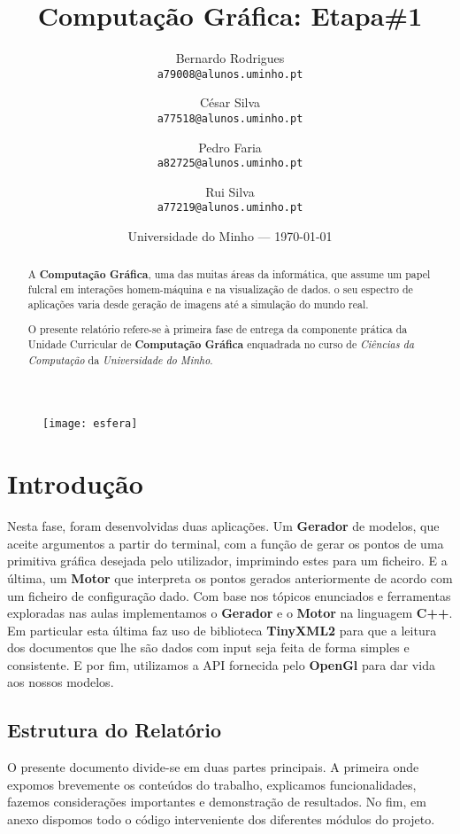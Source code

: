 \documentclass{article}
\title{Computação Gráfica: Etapa\#1} %
\author{Bernardo Rodrigues\\ \texttt{a79008@alunos.uminho.pt}\\ \and César Silva\\ \texttt{a77518@alunos.uminho.pt}\\ \and Pedro Faria\\ \texttt{a82725@alunos.uminho.pt} \and Rui Silva\\ \texttt{a77219@alunos.uminho.pt}\\} %
\date{Universidade do Minho --- \today} %
\begin{document}
\maketitle 
\begin{figure}[H]
	\centering
	\texttt{[image: esfera]}
\end{figure}
\newpage

\begin{abstract}
A \textbf{Computação Gráfica}, uma das muitas áreas da informática, que assume um papel fulcral em interações homem-máquina e na visualização de dados. o seu espectro de aplicações varia desde geração de imagens até a simulação do mundo real. \par
	O presente relatório refere-se à primeira fase de entrega da componente prática da Unidade Curricular de \textbf{Computação Gráfica} enquadrada no curso de \textit{Ciências da Computação} da \textit{Universidade do Minho}. 
\end{abstract}
\newpage


\tableofcontents{}
\newpage


\section{Introdução}

Nesta fase, foram desenvolvidas duas aplicações. Um \textbf{Gerador} de modelos, que aceite argumentos a partir do terminal, com a função de gerar os pontos de uma primitiva gráfica desejada pelo utilizador, imprimindo estes para um ficheiro. E a última, um \textbf{Motor} que interpreta os pontos gerados anteriormente de acordo com um ficheiro de configuração dado. 
Com base nos tópicos enunciados e ferramentas exploradas nas aulas implementamos o \textbf{Gerador} e o \textbf{Motor} na linguagem \textbf{C++}. Em particular esta última faz uso de biblioteca \textbf{TinyXML2} para que a leitura dos documentos que lhe são dados com input seja feita de forma simples e consistente. E por fim,  utilizamos a API fornecida pelo \textbf{OpenGl} para dar vida aos nossos modelos.

\subsection{Estrutura do Relatório}
O presente documento divide-se em duas partes principais. A primeira onde expomos brevemente os conteúdos do trabalho, explicamos funcionalidades, fazemos considerações importantes e demonstração de resultados.
No fim, em anexo dispomos  todo o código interveniente dos diferentes módulos do projeto. 
\end{document}
